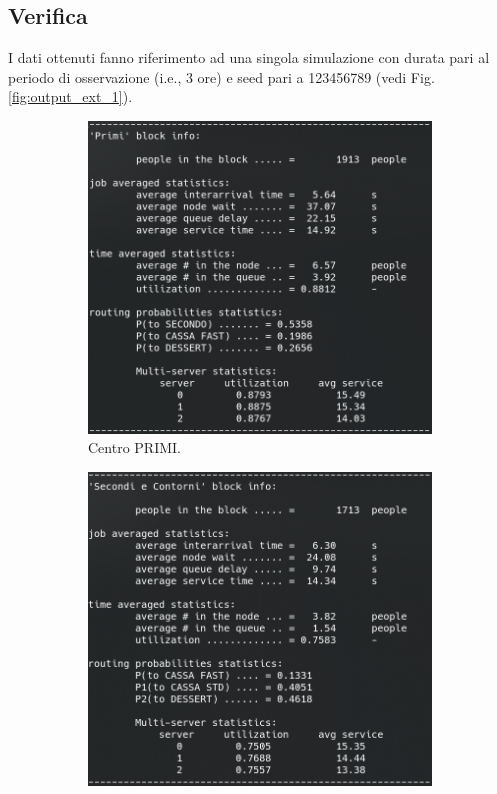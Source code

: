 \documentclass{article}
\begin{document}
\subsection{Verifica}

I dati ottenuti fanno riferimento ad una singola simulazione con durata pari al periodo di osservazione (i.e.,  3 ore) e seed pari a 123456789 (vedi Fig. \ref{fig:output_ext_1}).

\begin{figure}[H]
\begin{subfigure}{.5\textwidth}
  \centering
  \includegraphics[width=.9\linewidth]{img/migliorativo_1/primo_ext_1.png}
  \caption{Centro PRIMI.}
  \label{fig:primo_ext_1}
\end{subfigure}
\begin{subfigure}{.5\textwidth}
  \centering
  \includegraphics[width=.94\linewidth]{img/migliorativo_1/secondo_ext_1.png}

\end{subfigure}
\end{figure}
\end{document}
